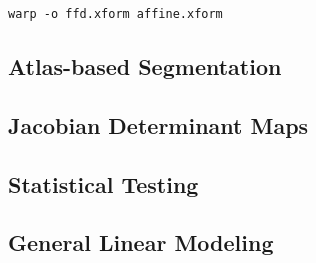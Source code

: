 \documentclass{InsightArticle}
\begin{document}
\cite{RuecSonoHaye:1999} \cite{RohlMaur:2003}

\begin{verbatim}
warp -o ffd.xform affine.xform
\end{verbatim}

\subsection{Atlas-based Segmentation}

\subsection{Jacobian Determinant Maps}

\subsection{Statistical Testing}

\subsection{General Linear Modeling}


%
%



\end{document}
